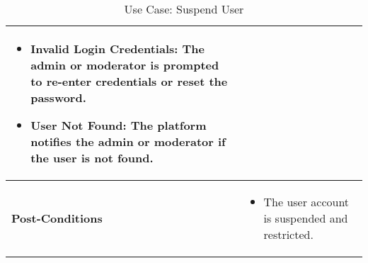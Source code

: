 \begin{table}[!ht]
\begin{tabularx}{\textwidth}{|l|X|}
        \begin{itemize}[label=--,itemsep=0pt]
            \item Invalid Login Credentials: The admin or moderator is prompted to re-enter credentials or reset the password.
            \item User Not Found: The platform notifies the admin or moderator if the user is not found.
        \end{itemize} \\
        \hline
        \textbf{Post-Conditions} & 
        \begin{itemize}[label=--,itemsep=0pt]
            \item The user account is suspended and restricted.
        \end{itemize} \\
        \hline
    \end{tabularx}
    \caption{Use Case: Suspend User}
    \label{tab:use-case-suspend-user}
\end{table}


